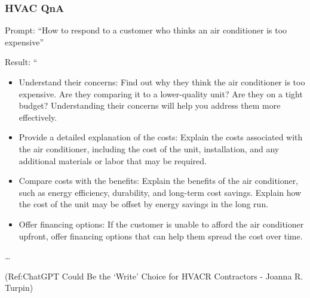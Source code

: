 \begin{frame}[fragile]\frametitle{HVAC QnA}
Prompt: ``How to respond to a customer who thinks an air conditioner is
too expensive''

Result: ``
\begin{itemize}
\item Understand their concerns: Find out why they think the air conditioner is too expensive.
Are they comparing it to a lower-quality unit? Are they on a tight budget? Understanding
their concerns will help you address them more effectively.
\item Provide a detailed explanation of the costs: Explain the costs associated with the air
conditioner, including the cost of the unit, installation, and any additional materials or labor
that may be required.
\item Compare costs with the benefits: Explain the benefits of the air conditioner, such as
energy efficiency, durability, and long-term cost savings. Explain how the cost of the unit may
be offset by energy savings in the long run.
\item Offer financing options: If the customer is unable to afford the air conditioner upfront,
offer financing options that can help them spread the cost over time.

\end{itemize}	 

\ldots

\tiny{(Ref:ChatGPT Could Be the ‘Write’ Choice for HVACR Contractors - Joanna R. Turpin)}
\end{frame}

